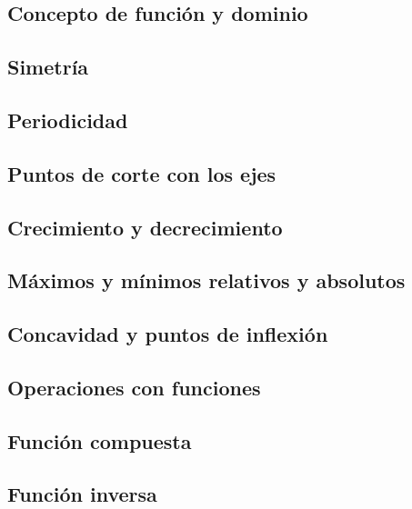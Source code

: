 \subsection{Concepto de función y dominio}


\subsection{Simetría}


\subsection{Periodicidad}


\subsection{Puntos de corte con los ejes}


\subsection{Crecimiento y decrecimiento}


\subsection{Máximos y mínimos relativos y absolutos}


\subsection{Concavidad y puntos de inflexión}


\subsection{Operaciones con funciones}


\subsection{Función compuesta}


\subsection{Función inversa}

